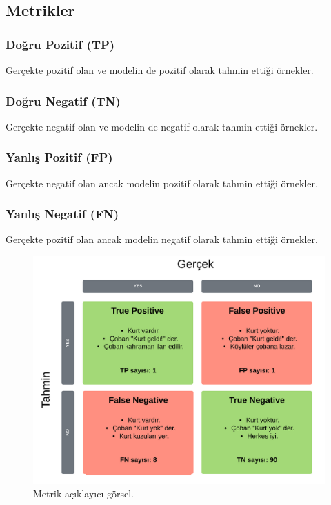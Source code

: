 \documentclass[12pt,a4paper]{article}
\begin{document}
\subsection{Metrikler}
\subsubsection{Doğru Pozitif (TP)}
\quad Gerçekte pozitif olan ve modelin de pozitif olarak tahmin ettiği örnekler.

\subsubsection{Doğru Negatif (TN)}
\quad Gerçekte negatif olan ve modelin de negatif olarak tahmin ettiği örnekler.

\subsubsection{Yanlış Pozitif (FP)}
\quad Gerçekte negatif olan ancak modelin pozitif olarak tahmin ettiği örnekler.

\subsubsection{Yanlış Negatif (FN)}
\quad Gerçekte pozitif olan ancak modelin negatif olarak tahmin ettiği örnekler.

\begin{figure}[!htbp]
    \centering
    \includegraphics[width=1\linewidth]{metrik_aciklama.png}
    \caption{Metrik açıklayıcı görsel\cite{Metrik}.}
    \label{fig:enter-label}
\end{figure}\newpage
\end{document}
